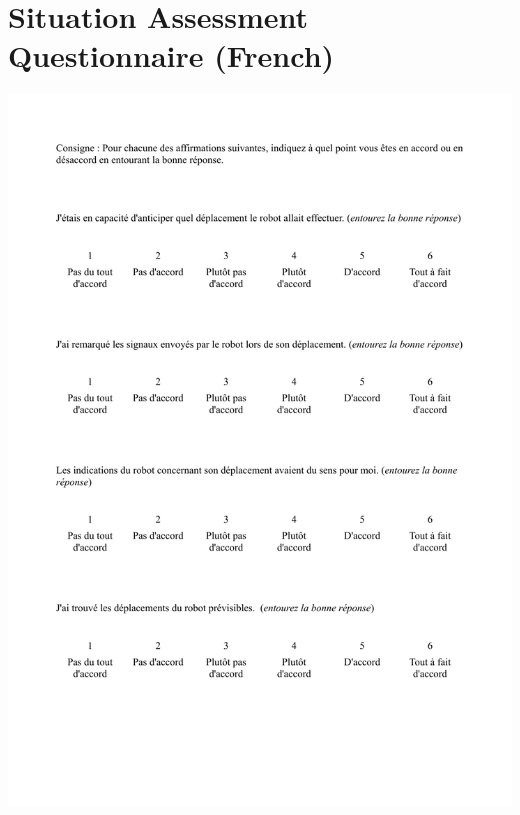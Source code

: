 \section{Situation Assessment Questionnaire (French)}
\begin{center}
\includegraphics[page=1, width=\textwidth]{Annexes/SAQuestionnaireFr.pdf} 
\end{center}


